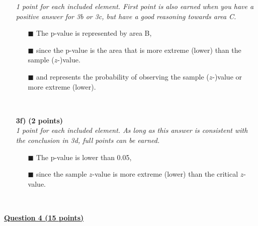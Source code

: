 \begin{itemize}
\textit{1 point for each included element. First point is also earned when you have a positive answer for 3b or 3c, but have a good reasoning towards area C.}
        \begin{itemize}
        \item[$\blacksquare$] The p-value is represented by area B,
        \item[$\blacksquare$] since the p-value is the area that is more extreme (lower) than the sample ($z$-)value.
        \item[$\blacksquare$] and represents the probability of observing the sample ($z$-)value or more extreme (lower).
        \end{itemize} \\
\item[\textbf{3f)}] \textbf{(2 points)} \\
\textit{1 point for each included element. As long as this answer is consistent with the conclusion in 3d, full points can be earned.}
        \begin{itemize}
        \item[$\blacksquare$] The p-value is lower than 0.05,
        \item[$\blacksquare$] since the sample $z$-value is more extreme (lower) than the critical $z$-value.
        \end{itemize} \\
\end{itemize}

\underline{\textbf{Question 4 (15 points)}} \\

